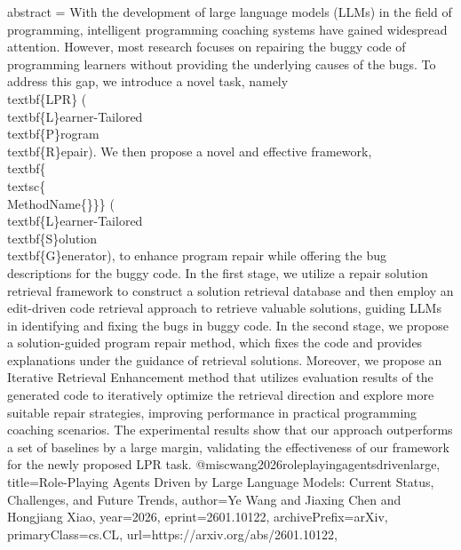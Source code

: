{      abstract = {With the development of large language models (LLMs) in the field of programming, intelligent programming coaching systems have gained widespread attention. However, most research focuses on repairing the buggy code of programming learners without providing the underlying causes of the bugs. To address this gap, we introduce a novel task, namely \\textbf\{LPR\} (\\textbf\{L\}earner-Tailored \\textbf\{P\}rogram \\textbf\{R\}epair). We then propose a novel and effective framework, \\textbf\{\\textsc\{\\MethodName\{\}\}\} (\\textbf\{L\}earner-Tailored \\textbf\{S\}olution \\textbf\{G\}enerator), to enhance program repair while offering the bug descriptions for the buggy code. In the first stage, we utilize a repair solution retrieval framework to construct a solution retrieval database and then employ an edit-driven code retrieval approach to retrieve valuable solutions, guiding LLMs in identifying and fixing the bugs in buggy code. In the second stage, we propose a solution-guided program repair method, which fixes the code and provides explanations under the guidance of retrieval solutions. Moreover, we propose an Iterative Retrieval Enhancement method that utilizes evaluation results of the generated code to iteratively optimize the retrieval direction and explore more suitable repair strategies, improving performance in practical programming coaching scenarios. The experimental results show that our approach outperforms a set of baselines by a large margin, validating the effectiveness of our framework for the newly proposed LPR task.}
}@misc{wang2026roleplayingagentsdrivenlarge,
      title={Role-Playing Agents Driven by Large Language Models: Current Status, Challenges, and Future Trends}, 
      author={Ye Wang and Jiaxing Chen and Hongjiang Xiao},
      year={2026},
      eprint={2601.10122},
      archivePrefix={arXiv},
      primaryClass={cs.CL},
      url={https://arxiv.org/abs/2601.10122},
}
